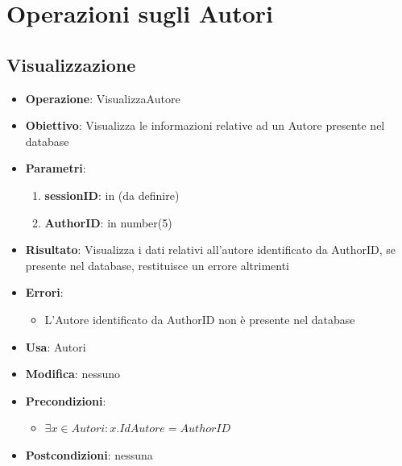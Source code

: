 \documentclass[a4paper,11pt]{article}
\begin{document}
\newpage

\section{Operazioni sugli Autori}

\subsection{Visualizzazione}
\begin{itemize}
	\item \textbf{Operazione}: VisualizzaAutore
	\item \textbf{Obiettivo}: Visualizza le informazioni relative ad un Autore presente nel database
	\item \textbf{Parametri}:
	\begin{enumerate}
		\item \textbf{sessionID}: in (da definire)
		\item \textbf{AuthorID}: in number(5)
	\end{enumerate}
	\item \textbf{Risultato}: Visualizza i dati relativi all'autore identificato da AuthorID, se presente nel database, restituisce un errore altrimenti
	\item \textbf{Errori}: 
	\begin{itemize}
		\item L'Autore identificato da AuthorID non è presente nel database
	\end{itemize}
	\item \textbf{Usa}: Autori
	\item \textbf{Modifica}: nessuno
	\item \textbf{Precondizioni}:
	\begin{itemize}
		\item $\exists x \in Autori : x.IdAutore = AuthorID$
	\end{itemize}
	\item \textbf{Postcondizioni}: nessuna
\end{itemize}

\end{document}
